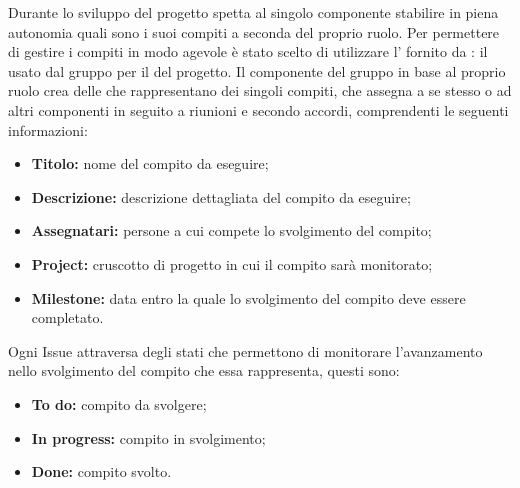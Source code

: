 \label{GestioneCompiti}
Durante lo sviluppo del progetto spetta al singolo componente stabilire in piena autonomia quali sono i suoi compiti a seconda del proprio ruolo.
Per permettere di gestire i compiti in modo agevole è stato scelto di utilizzare l' fornito da : il  usato dal gruppo per il  del progetto.
Il componente del gruppo in base al proprio ruolo crea delle  che rappresentano dei singoli compiti, che assegna a se stesso o ad altri componenti in seguito a riunioni e secondo accordi, comprendenti le seguenti informazioni:
\begin{itemize}
	\item \textbf{Titolo:} nome del compito da eseguire;
	\item \textbf{Descrizione:} descrizione dettagliata del compito da eseguire;
	\item \textbf{Assegnatari:} persone a cui compete lo svolgimento del compito;
	\item \textbf{Project:} cruscotto di progetto in cui il compito sarà monitorato;
	\item \textbf{Milestone:} data entro la quale lo svolgimento del compito deve essere completato.
\end{itemize}
Ogni Issue attraversa degli stati che permettono di monitorare l'avanzamento nello svolgimento del compito che essa rappresenta, questi sono:
\begin{itemize}
	\item \textbf{To do:} compito da svolgere;
	\item \textbf{In progress:} compito in svolgimento;
	\item \textbf{Done:} compito svolto.
\end{itemize}

